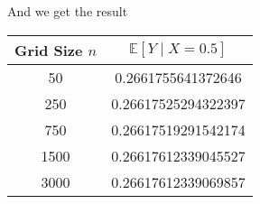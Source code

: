 \documentclass[12pt]{article}
\begin{document}
\begin{flushleft}
\qquad And we get the result

\begin{table}[h]
\centering
\begin{tabular}{cc}
\hline
Grid Size $n$ & $\mathbb{E}\left[Y\mid X = 0.5\right]$ \\
\hline
50    &  0.2661755641372646    \\
250   &  0.26617525294322397   \\
750   &  0.26617519291542174   \\
1500  &  0.26617612339045527   \\
3000  &  0.26617612339069857   \\
\hline
\end{tabular}
\end{table}

\end{flushleft}
\end{document}
